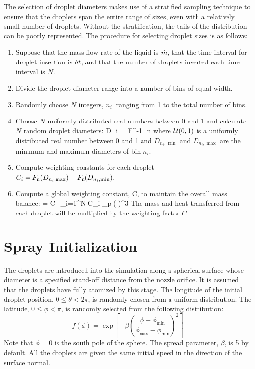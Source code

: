 The selection of droplet diameters makes use of a stratified sampling technique to ensure that the droplets span the entire range of sizes, even with a relatively small number of droplets. Without the stratification, the tails of the distribution can be poorly represented. The procedure for selecting droplet sizes is as follows:
\begin{enumerate}
\item Suppose that the mass flow rate of the liquid is $\dot{m}$, that the time interval for droplet insertion is $\delta t$, and that the number of droplets inserted each time interval is $N$.
\item Divide the droplet diameter range into a number of bins of equal width.
\item Randomly choose $N$ integers, $n_i$, ranging from 1 to the total number of bins.
\item Choose $N$ uniformly distributed real numbers between 0 and 1 and calculate $N$ random droplet diameters:
\be
   D_i = F^{-1}_{\rm n}  \label{Ud_strat}
\ee
where ${\cal U}(0,1)$ is a uniformly distributed real number between 0 and 1 and $D_{n_i,\min}$ and $D_{n_i,\max}$ are the minimum and maximum diameters of bin $n_i$.
\item Compute weighting constants for each droplet $C_i = F_{\rm n}(D_{n_i,\max}) - F_{\rm n}(D_{n_i,\min})$.
\item Compute a global weighting constant, C, to maintain the overall mass balance:
    \be \dm \; \dt = C \, \sum_{i=1}^N \; C_i \;  \pi \rho_{\rm p}
      \left(  \right)^3
    \ee
    The mass and heat transferred from each droplet will be multiplied by the weighting factor $C$.
\end{enumerate}


\section{Spray Initialization}

The droplets are introduced into the simulation along a spherical surface whose diameter is a specified stand-off distance from the nozzle orifice. It is assumed that the droplets have fully atomized by this stage. The longitude of the initial droplet position, $0\le \theta < 2 \pi$, is randomly chosen from a uniform distribution. The latitude, $0 \le \phi < \pi$, is randomly selected from the following distribution:
\begin{equation}
  f(\phi) = \exp \left[ - \beta \left( \frac{\phi - \phi_{\min}}{\phi_{\max} - \phi_{\min}} \right)^2 \right]
\end{equation}
Note that $\phi=0$ is the south pole of the sphere. The spread parameter, $\beta$, is 5 by default. All the droplets are given the same initial speed in the direction of the surface normal.



